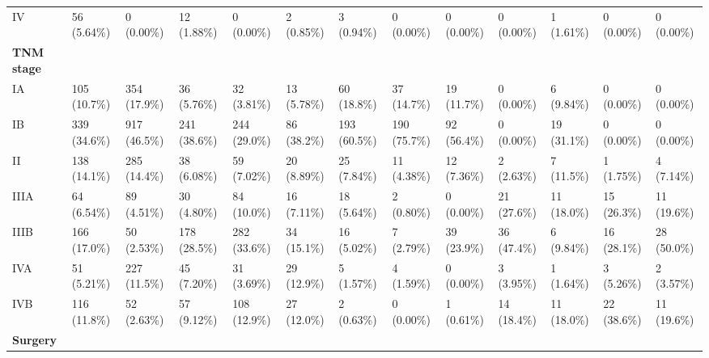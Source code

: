 \documentclass{article}
\begin{document}
\begin{landscape}
\begin{tiny}
\begin{tabularx}{\linewidth}{p{2.0cm}|X|X|X|X|X|X|X|X|X|X|X|X}
    IV &    56 (5.64\%)    &    0 (0.00\%)     &    12 (1.88\%)    &    0 (0.00\%)     &    2 (0.85\%)     &    3 (0.94\%)     &    0 (0.00\%)     &    0 (0.00\%)     &    0 (0.00\%)     &    1 (1.61\%)     &    0 (0.00\%)     &    0 (0.00\%)     \\
\rowcolor{gray!30}
\textbf{TNM stage }  &  &  &  &  &  &  &  &  &  &  &  &  \\
\rowcolor{gray!10}
    IA &   105 (10.7\%)    &   354 (17.9\%)    &    36 (5.76\%)    &    32 (3.81\%)    &    13 (5.78\%)    &    60 (18.8\%)    &    37 (14.7\%)    &    19 (11.7\%)    &    0 (0.00\%)     &    6 (9.84\%)     &    0 (0.00\%)     &    0 (0.00\%)     \\
\rowcolor{gray!10}
    IB &   339 (34.6\%)    &   917 (46.5\%)    &   241 (38.6\%)    &   244 (29.0\%)    &    86 (38.2\%)    &   193 (60.5\%)    &   190 (75.7\%)    &    92 (56.4\%)    &    0 (0.00\%)     &    19 (31.1\%)    &    0 (0.00\%)     &    0 (0.00\%)     \\
\rowcolor{gray!10}
    II &   138 (14.1\%)    &   285 (14.4\%)    &    38 (6.08\%)    &    59 (7.02\%)    &    20 (8.89\%)    &    25 (7.84\%)    &    11 (4.38\%)    &    12 (7.36\%)    &    2 (2.63\%)     &    7 (11.5\%)     &    1 (1.75\%)     &    4 (7.14\%)     \\
\rowcolor{gray!10}
    IIIA &    64 (6.54\%)    &    89 (4.51\%)    &    30 (4.80\%)    &    84 (10.0\%)    &    16 (7.11\%)    &    18 (5.64\%)    &    2 (0.80\%)     &    0 (0.00\%)     &    21 (27.6\%)    &    11 (18.0\%)    &    15 (26.3\%)    &    11 (19.6\%)    \\
\rowcolor{gray!10}
    IIIB &   166 (17.0\%)    &    50 (2.53\%)    &   178 (28.5\%)    &   282 (33.6\%)    &    34 (15.1\%)    &    16 (5.02\%)    &    7 (2.79\%)     &    39 (23.9\%)    &    36 (47.4\%)    &    6 (9.84\%)     &    16 (28.1\%)    &    28 (50.0\%)    \\
\rowcolor{gray!10}
    IVA &    51 (5.21\%)    &   227 (11.5\%)    &    45 (7.20\%)    &    31 (3.69\%)    &    29 (12.9\%)    &    5 (1.57\%)     &    4 (1.59\%)     &    0 (0.00\%)     &    3 (3.95\%)     &    1 (1.64\%)     &    3 (5.26\%)     &    2 (3.57\%)     \\
\rowcolor{gray!10}
    IVB &   116 (11.8\%)    &    52 (2.63\%)    &    57 (9.12\%)    &   108 (12.9\%)    &    27 (12.0\%)    &    2 (0.63\%)     &    0 (0.00\%)     &    1 (0.61\%)     &    14 (18.4\%)    &    11 (18.0\%)    &    22 (38.6\%)    &    11 (19.6\%)    \\
\rowcolor{gray!30}
\textbf{Surgery }  &  &  &  &  &  &  &  &  &  &  &  &  \\

\end{tabularx}
\end{tiny}
\end{landscape}
\end{document}
